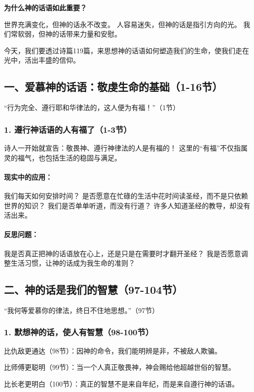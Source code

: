 \documentclass[a4paper, 12pt]{article}
\begin{document}
\textbf{为什么神的话语如此重要？}

世界充满变化，但神的话永不改变。
人容易迷失，但神的话是指引方向的光。
我们常软弱，但神的话带来力量和安慰。

今天，我们要透过诗篇119篇，来思想神的话语如何塑造我们的生命，使我们走在光中，活出丰盛的信仰。

\subsection*{一、爱慕神的话语：敬虔生命的基础（1-16节）}
“行为完全、遵行耶和华律法的，这人便为有福！”（1节）

\subsubsection*{1. 遵行神话语的人有福了（1-3节）}
诗人一开始就宣告：敬畏神、遵行神律法的人是有福的！ 这里的“有福”不仅指属灵的福气，也包括生活的稳固与满足。

\paragraph*{现实中的应用：}

我们每天如何安排时间？ 是否愿意在忙碌的生活中花时间读圣经，而不是只依赖世界的知识？
我们是否单单听道，而没有行道？ 许多人知道圣经的教导，却没有活出来。
\paragraph*{反思问题：}

我是否真正把神的话语放在心上，还是只是在需要时才翻开圣经？
我是否愿意调整生活习惯，让神的话成为我生命的准则？
\subsection*{二、神的话是我们的智慧（97-104节）}
“我何等爱慕你的律法，终日不住地思想。”（97节）

\subsubsection*{1. 默想神的话，使人有智慧（98-100节）}

\hspace{0.6cm}比仇敌更通达（98节）：因神的命令，我们能明辨是非，不被敌人欺骗。

比师傅更聪明（99节）：当一个人真正敬畏神，神会赐给他超越世俗的智慧。

比长老更明白（100节）：真正的智慧不是来自年纪，而是来自遵行神的话语。
\end{document}
